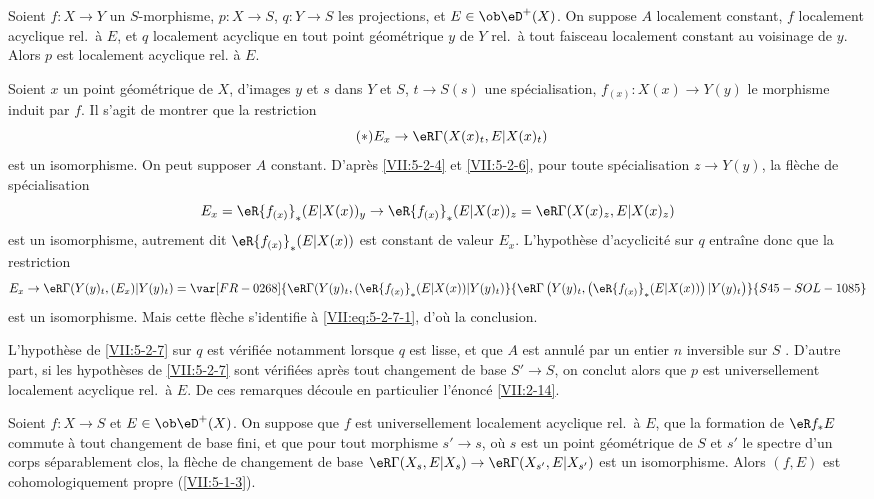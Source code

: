 \begin{corollary}\label{VII:5-2-7}
Soient $f:X\to Y$ un $S$-morphisme, $p:X\to S$, $q:Y\to S$ les projections, et 
$E\in\ob\eD^+(X)$. On suppose $A$ localement constant, $f$ localement acyclique 
rel.\ à $E$, et $q$ localement acyclique en tout point géométrique $y$ de 
$Y$ rel.\ à tout faisceau localement constant au voisinage de $y$. Alors $p$ 
est localement acyclique rel. à $E$. 
\end{corollary}

Soient $x$ un point géométrique de $X$, d'images $y$ et $s$ dans $Y$ et 
$S$, $t\to S(s)$ une spécialisation, $f_{(x)}:X(x)\to Y(y)$ le morphisme 
induit par $f$. Il s'agit de montrer que la restriction 
\begin{equation*}\tag{$*$}\label{VII:eq:5-2-7-1}
  E_x \to \eR\Gamma(X(x)_t,E|X(x)_t) 
\end{equation*}
est un isomorphisme. On peut supposer $A$ constant. D'après \ref{VII:5-2-4} et 
\ref{VII:5-2-6}, pour toute spécialisation $z\to Y(y)$, la flèche de 
spécialisation 
\[
  E_x = \eR {f_{(x)}}_\ast (E|X(x))_y \to \eR {f_{(x)}}_\ast (E|X(x))_z = \eR\Gamma(X(x)_z,E|X(x)_z) 
\]
est un isomorphisme, autrement dit $\eR{f_{(x)}}_\ast(E|X(x))$ est constant de 
valeur $E_x$. L'hypothèse d'acyclicité sur $q$ entra\^ine donc que la 
restriction 
\[
  E_x \to \eR\Gamma(Y(y)_t,(E_x)|Y(y)_t) = \var[FR-0268]{\eR\Gamma(Y(y)_t,(\eR {f_{(x)}}_\ast (E|X(x))|Y(y)_t)}{\eR\Gamma\left(Y(y)_t,\left(\eR {f_{(x)}}_\ast (E|X(x))\right)|Y(y)_t\right)}{S45-SOL-1085}
\]
est un isomorphisme. Mais cette flèche s'identifie à 
\eqref{VII:eq:5-2-7-1}, d'où la conclusion. 

L'hypothèse de \ref{VII:5-2-7} sur $q$ est vérifiée notamment lorsque $q$ 
est lisse, et que $A$ est annulé par un entier $n$ inversible sur $S$ 
. D'autre part, si les hypothèses de \ref{VII:5-2-7} sont 
vérifiées après tout changement de base $S'\to S$, on conclut alors que 
$p$ est universellement localement acyclique rel.\ à $E$. De ces remarques 
découle en particulier l'énoncé \ref{VII:2-14}. 





\begin{corollary}\label{VII:5-2-8}
Soient $f:X\to S$ et $E\in \ob\eD^+(X)$. On suppose que $f$ est universellement 
localement acyclique rel.\ à $E$, que la formation de $\eR f_\ast E$ commute 
à tout changement de base fini, et que pour tout morphisme $s'\to s$, où 
$s$ est un point géométrique de $S$ et $s'$ le spectre d'un corps 
séparablement clos, la flèche de changement de base 
$\eR\Gamma(X_s,E|X_s)\to \eR\Gamma(X_{s'},E|X_{s'})$ est un isomorphisme. 
Alors $(f,E)$ est cohomologiquement propre (\ref{VII:5-1-3}). 
\end{corollary}

